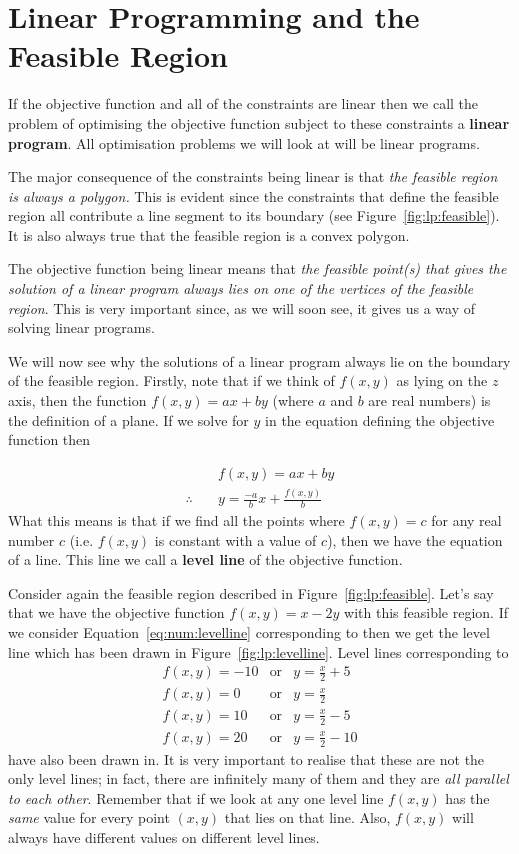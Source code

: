 \section{Linear Programming and the Feasible Region}
If the objective function and all of the constraints are linear then we call the problem of optimising the objective function subject to these constraints a \textbf{linear program}. All optimisation problems we will look at will be linear programs.

The major consequence of the constraints being linear is that \textit{the feasible region is always a polygon.} This is evident since the constraints that define the feasible region all contribute a line segment to its boundary (see Figure~\ref{fig:lp:feasible}). It is also always true that the feasible region is a convex polygon.

The objective function being linear means that \textit{the feasible point(s) that gives the solution of a linear program always lies on one of the vertices of the feasible region}. This is very important since, as we will soon see, it gives us a way of solving linear programs. 

We will now see why the solutions of a linear program always lie on the boundary of the feasible region. Firstly, note that if we think of $f(x,y)$ as lying on the $z$ axis, then the function $f(x,y)=ax+by$ (where $a$ and $b$ are real numbers) is the definition of a plane. If we solve for $y$ in the equation defining the objective function then

\begin{align}
\nonumber & \quad f(x,y)=ax+by\\
\therefore & \quad y=\frac{-a}{b}x+\frac{f(x,y)}{b}
\end{align}
\label{eq:num:levelline}
What this means is that if we find all the points where $f(x,y)=c$ for any real number $c$ (i.e. $f(x,y)$ is constant with a value of $c$), then we have the equation of a line. This line we call a \textbf{level line} of the objective function.

Consider again the feasible region described in Figure~\ref{fig:lp:feasible}. Let's say that we have the objective function $f(x,y)=x-2y$ with this feasible region. If we consider Equation~\ref{eq:num:levelline} corresponding to
then we get the level line
which has been drawn in Figure~\ref{fig:lp:levelline}. Level lines corresponding to
\begin{eqnarray*}
f(x,y)=-10 &\text{or}&y=\frac{x}{2}+5\\
f(x,y)=0 &\text{or}& y=\frac{x}{2}\\
f(x,y)=10 &\text{or}& y=\frac{x}{2}-5\\
f(x,y)=20 &\text{or}& y=\frac{x}{2}-10
\end{eqnarray*}
have also been drawn in. It is very important to realise that these are not the only level lines; in fact, there are infinitely many of them and they are \textit{all parallel to each other}. Remember that if we look at any one level line $f(x,y)$ has the \textit{same} value for every point $(x,y)$ that lies on that line. Also, $f(x,y)$ will always have different values on different level lines.

